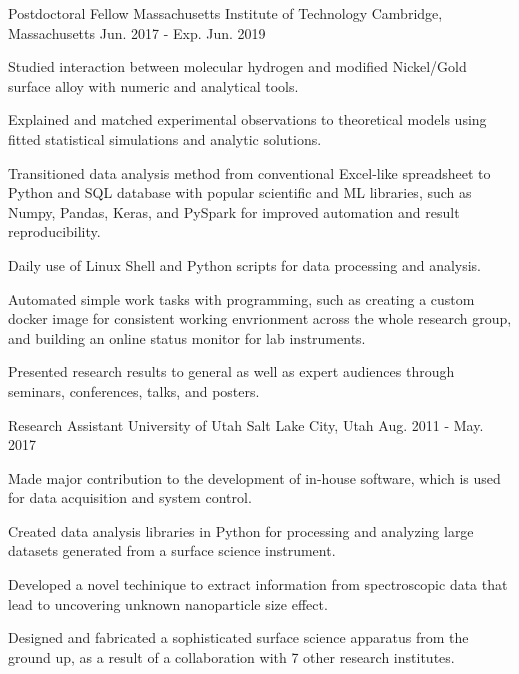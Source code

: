 


\begin{cventries}


\cventry
{Postdoctoral Fellow}
{Massachusetts Institute of Technology}
{Cambridge, Massachusetts}
{Jun. 2017 - Exp. Jun. 2019}
{
\begin{cvitems}
\item {Studied interaction between molecular hydrogen and modified Nickel/Gold
    surface alloy with numeric and analytical tools.}
\item {Explained and matched experimental observations to theoretical models
    using fitted statistical simulations and analytic solutions.}
\item {Transitioned data analysis method from conventional Excel-like
    spreadsheet to Python and SQL database with popular scientific and ML libraries,
    such as Numpy, Pandas, Keras, and PySpark for improved automation and result
    reproducibility.}
\item {Daily use of Linux Shell and Python scripts for data processing and analysis.}
\item {Automated simple work tasks with programming, such as creating a custom
    docker image for consistent working envrionment across the whole research group, and
    building an online status monitor for lab instruments.}
\item {Presented research results to general as well as expert audiences
    through seminars, conferences, talks, and posters.}
\end{cvitems}
}


\cventry
{Research Assistant}
{University of Utah}
{Salt Lake City, Utah}
{Aug. 2011 - May. 2017}
{
\begin{cvitems}
\item {Made major contribution to the development of in-house software, which is used
    for data acquisition and system control.}
\item {Created data analysis libraries in Python for processing and analyzing
    large datasets generated from a surface science instrument.}
\item {Developed a novel techinique to extract information from spectroscopic
    data that lead to uncovering unknown nanoparticle size effect.}
\item {Designed and fabricated a sophisticated surface science apparatus from
    the ground up, as a result of a collaboration with 7 other research institutes.}
\end{cvitems}
}


\end{cventries}
